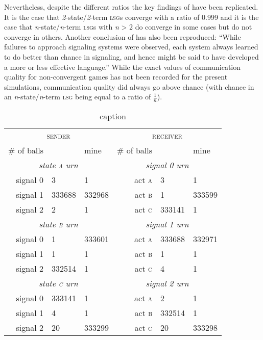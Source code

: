 \documentclass[
	DIV=calc,
	BCOR=0mm,
	pagesize,
]{scrartcl}
\newcommand{\lsg}{\textsc{lsg}}
\newcommand{\nslsg}[1]{\textit{#1}-state/\textit{#1}-term \lsg}
\begin{document}
Nevertheless, despite the different ratios the key findings of \citet{barrett_numerical_2006} have been replicated.
It is the case that \nslsg{2}s converge with a ratio of 0.999 and it is the case that \nslsg{n}s with \textit{n} > 2 do converge in some cases but do not converge in others.
Another conclusion of \citet[sec.~2, unpaginated preprint]{barrett_numerical_2006} has also been reproduced: ``While failures to approach signaling systems were observed, each system always learned to do better than chance in signaling, and hence might be said to have developed a more or less effective language.''
While the exact values of communication quality for non-convergent games has not been recorded for the present simulations, communication quality did always go above chance (with chance in an \nslsg{n} being equal to a ratio of \(\frac{1}{n}\)).

\begin{table}
	\centering
	\begin{tabular}{rllrll}
		\toprule
		\multicolumn{3}{c}{\textsc{sender}} & \multicolumn{3}{c}{\textsc{receiver}} \\
		\cmidrule(lr){1-3}\cmidrule(lr){4-6}
		\# of balls & \citeauthor{barrett_numerical_2006} & mine & \# of balls & \citeauthor{barrett_numerical_2006} & mine \\
		\midrule
		\multicolumn{3}{c}{\emph{state \textsc{a} urn}} & \multicolumn{3}{c}{\emph{signal 0 urn}} \\
		\cmidrule(lr){1-3}\cmidrule(lr){4-6}
		signal 0 & 3      & 1      & act \textsc{a} & 3      & 1 \\
		signal 1 & 333688 & 332968 & act \textsc{b} & 1      & 333599 \\
		signal 2 & 2      & 1      & act \textsc{c} & 333141 & 1 \\
		\midrule
		\multicolumn{3}{c}{\emph{state \textsc{b} urn}} & \multicolumn{3}{c}{\emph{signal 1 urn}} \\
		\cmidrule(lr){1-3}\cmidrule(lr){4-6}
		signal 0 & 1      & 333601 & act \textsc{a} & 333688 & 332971 \\
		signal 1 & 1      & 1      & act \textsc{b} & 1      & 1 \\
		signal 2 & 332514 & 1      & act \textsc{c} & 4      & 1 \\
		\midrule
		\multicolumn{3}{c}{\emph{state \textsc{c} urn}} & \multicolumn{3}{c}{\emph{signal 2 urn}} \\
		\cmidrule(lr){1-3}\cmidrule(lr){4-6}
		signal 0 & 333141 & 1      & act \textsc{a} & 2      & 1 \\
		signal 1 & 4      & 1      & act \textsc{b} & 332514 & 1 \\
		signal 2 & 20     & 333299 & act \textsc{c} & 20     & 333298 \\
		\bottomrule
	\end{tabular}
	\caption{caption}
	\label{tab:urns}
\end{table}
\end{document}
